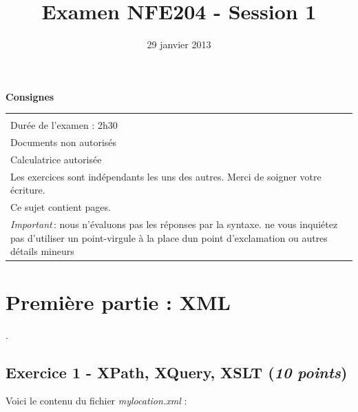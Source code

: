 \documentclass[9pt,a4paper]{article}
\begin{document}
\title{Examen NFE204 - Session 1}
\date{29 janvier 2013}

\maketitle

\begin{center}
{\bf \Large Consignes}\\
\begin{tabular}{| p{15cm} |}
\hline
\\
Dur\'ee de l'examen : 2h30\\
Documents non autoris\'es\\
Calculatrice autoris\'ee\\
Les exercices sont ind\'ependants les uns des autres. Merci de soigner votre \'ecriture.\\
Ce sujet contient \pageref{LastPage} pages.\\


\textit{Important}\,: nous n'évaluons pas les réponses par la syntaxe. ne vous
inquiétez pas d'utiliser un point-virgule à la place dun point d'exclamation ou
autres détails mineurs
\\
\hline
\end{tabular}
\end{center}

\pagebreak

\section*{Première partie : XML}
. 
\subsection*{\Large Exercice 1 - XPath, XQuery, XSLT ({\it 10 points})}

Voici le contenu du fichier \textit{mylocation.xml} :
\vspace{-0.05cm} 

\end{document}
